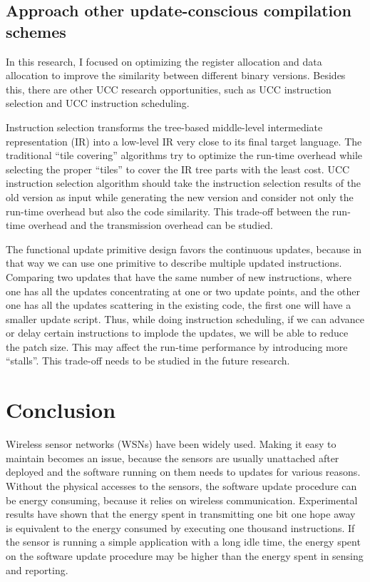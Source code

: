 \subsection{Approach other update-conscious compilation schemes}
In this research, I focused on optimizing the register allocation and data allocation to improve the similarity between 
different binary versions. Besides this, there are other UCC research opportunities, such as UCC instruction selection 
and UCC instruction scheduling.

Instruction selection transforms the tree-based middle-level intermediate representation (IR) into a low-level IR very 
close to its final target language. The traditional ``tile covering'' algorithms try to optimize the run-time overhead 
while selecting the proper ``tiles'' to cover the IR tree parts with the least cost. UCC instruction selection 
algorithm should take the instruction selection results of the old version as input while generating the new version 
and consider not only the run-time overhead but also the code similarity. This trade-off between the run-time overhead 
and the transmission overhead can be studied.

The functional update primitive design favors the continuous updates, because in that way we can use one primitive to 
describe multiple updated instructions. 
Comparing two updates that have the same number of new instructions, where one has all the updates concentrating at one 
or two update points, and the other one has all the updates scattering in the existing code, the first one will have a 
smaller update script. 
Thus, while doing instruction scheduling, if we can advance or delay certain instructions to implode the updates, we 
will be able to reduce the patch size.
This may affect the run-time performance by introducing more ``stalls''. This trade-off needs to be studied in the 
future research.

\section{Conclusion}
Wireless sensor networks (WSNs) have been widely used. Making it easy to maintain becomes an issue, because the sensors 
are usually unattached after deployed and the software running on them needs to updates for various reasons.
Without the physical accesses to the sensors, the software update procedure can be energy consuming, because it relies 
on wireless communication. Experimental results have shown that the energy spent in transmitting one bit one hope away 
is equivalent to the energy consumed by executing one thousand instructions. If the sensor is running a simple 
application with a long idle time, the energy spent on the software update procedure may be higher than the energy 
spent in sensing and reporting.

